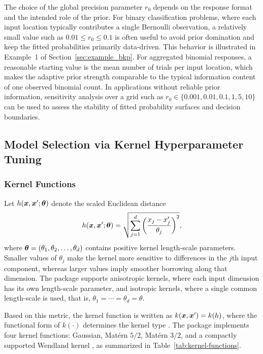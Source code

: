\documentclass[article, shortnames]{jss}
\renewcommand{\vec}[1]{\mbox{\boldmath ${#1}$}}
\begin{document}
The choice of the global precision parameter $r_0$ depends on the response format and the intended role of the prior. 
For binary classification problems, where each input location typically contributes a single Bernoulli observation, a relatively small value such as $0.01 \leq r_0 \leq 0.1$ is often useful to avoid prior domination and keep the fitted probabilities primarily data-driven. 
This behavior is illustrated in Example~1 of Section~\ref{sec:example_bkp}. 
For aggregated binomial responses, a reasonable starting value is the mean number of trials per input location, which makes the adaptive prior strength comparable to the typical information content of one observed binomial count. 
In applications without reliable prior information, sensitivity analysis over a grid such as $r_0 \in \{0.001, 0.01, 0.1, 1, 5, 10\}$ can be used to assess the stability of fitted probability surfaces and decision boundaries.

\subsection{Model Selection via Kernel Hyperparameter Tuning}\label{sec:model-selection}

\subsubsection{Kernel Functions}

Let $h(\vec{x}, \vec{x}'; \vec{\theta})$ denote the scaled Euclidean distance
\[
	h(\vec{x}, \vec{x}'; \vec{\theta}) = \sqrt{\sum_{j=1}^{d} \left(\frac{x_{j} - x_{j}'}{\theta_{j}}\right)^{2}},
\]
where $\vec{\theta} = (\theta_1, \theta_2, \ldots, \theta_d)$ contains positive kernel length-scale parameters. 
Smaller values of $\theta_j$ make the kernel more sensitive to differences in the $j$th input component, whereas larger values imply smoother borrowing along that dimension. 
The  package supports anisotropic kernels, where each input dimension has its own length-scale parameter, and isotropic kernels, where a single common length-scale is used, that is, $\theta_1=\cdots=\theta_d=\theta$.

Based on this metric, the kernel function is written as $k(\vec{x},\vec{x}')=k(h)$, where the functional form of $k(\cdot)$ determines the kernel type \citep{Rasmussen2006GPML}. 
The  package implements four kernel functions: Gaussian, Mat{\'e}rn $5/2$, Mat{\'e}rn $3/2$, and a compactly supported Wendland kernel \citep{Wendland1995}, as summarized in Table~\ref{tab:kernel-functions}.
\end{document}
